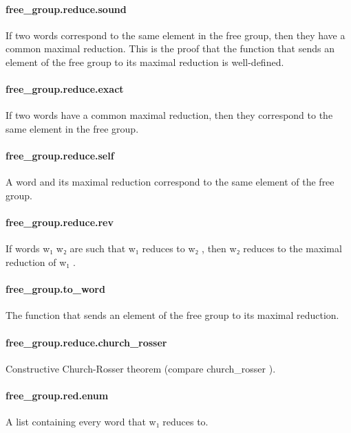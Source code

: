 \documentclass{article}
\begin{document}
\paragraph{free\_group.reduce.sound}
\par
If two words correspond to the same element in
the free group, then they have a common maximal
reduction. This is the proof that the function that
sends an element of the free group to its maximal
reduction is well-defined.
\paragraph{free\_group.reduce.exact}
\par
If two words have a common maximal reduction,
then they correspond to the same element in the free group.
\paragraph{free\_group.reduce.self}
\par
A word and its maximal reduction correspond to
the same element of the free group.
\paragraph{free\_group.reduce.rev}
\par
If words 
\colorbox[RGB]{253,246,227}{{{{\color[RGB]{101, 123, 131} w₁ w₂ }}}} are such that 
\colorbox[RGB]{253,246,227}{{{{\color[RGB]{101, 123, 131} w₁ }}}} reduces to 
\colorbox[RGB]{253,246,227}{{{{\color[RGB]{101, 123, 131} w₂ }}}},
then 
\colorbox[RGB]{253,246,227}{{{{\color[RGB]{101, 123, 131} w₂ }}}} reduces to the maximal reduction of 
\colorbox[RGB]{253,246,227}{{{{\color[RGB]{101, 123, 131} w₁ }}}}.
\paragraph{free\_group.to\_word}
\par
The function that sends an element of the free
group to its maximal reduction.
\paragraph{free\_group.reduce.church\_rosser}
\par
Constructive Church-Rosser theorem (compare 
\colorbox[RGB]{253,246,227}{{{{\color[RGB]{101, 123, 131} church\_rosser }}}}).
\paragraph{free\_group.red.enum}
\par
A list containing every word that 
\colorbox[RGB]{253,246,227}{{{{\color[RGB]{101, 123, 131} w₁ }}}} reduces to.
\end{document}
